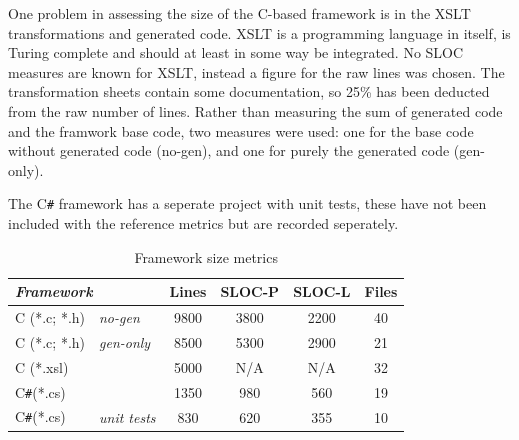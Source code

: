 \documentclass[twoside,openright]{uva-bachelor-thesis}
\newcommand{\cs}{C\texttt{\#}\xspace}
\begin{document}
		One problem in assessing the size of the C-based framework is in the XSLT transformations and generated code. XSLT is a programming language in itself, is Turing complete and should at least in some way be integrated. No SLOC measures are known for XSLT, instead a figure for the raw lines was chosen. The transformation sheets contain some documentation, so 25\% has been deducted from the raw number of lines. Rather than measuring the sum of generated code and the framwork base code, two measures were used: one for the base code without generated code (no-gen), and one for purely the generated code (gen-only).
		
		The \cs framework has a seperate project with unit tests, these have not been included with the reference metrics but are recorded seperately.
				
		\begin{table}[h]
			\centering
			\bgroup
			\def\arraystretch{1.25}
			\begin{tabular}{|ll|c|c|c|c|}
				\hline
				\multicolumn{2}{|l|}{{\it Framework}} & \multicolumn{1}{l|}{{\bf Lines}} & \multicolumn{1}{l|}{{\bf SLOC-P}} & \multicolumn{1}{l|}{{\bf SLOC-L}} & \multicolumn{1}{l|}{{\bf Files}} \\ \hline
				C (*.c; *.h) & {\it no-gen} & 9800 & 3800 & 2200 & 40 \\ \hline
				C (*.c; *.h) & {\it gen-only} & 8500 & 5300 & 2900 & 21 \\ \hline
				\multicolumn{2}{|l|}{C (*.xsl)} & 5000 & N/A & N/A & 32 \\ \hline
				\multicolumn{2}{|l|}{\cs (*.cs)} & 1350 & 980 & 560 & 19 \\ \hline
				\cs (*.cs) & {\it unit tests} & 830 & 620 & 355 & 10 \\ \hline
			\end{tabular}
			\egroup
			\caption{Framework size metrics}
			\label{locmetrics}
		\end{table}
		
\end{document}
